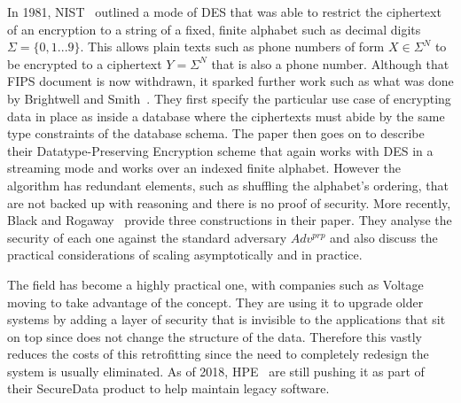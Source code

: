 \documentclass[ %
                    author={Samuel Russell},
                supervisor={Prof. Bogdan Warinschi},
                    degree={MEng},
                     title={Innocuous Ciphertexts},
                  subtitle={The DE-CENSOR Scheme},
                      type={research},
                      year={2018} ]{dissertation}
\begin{document}
In 1981, NIST~\cite{FIPS74} outlined a mode of DES that was able to restrict the ciphertext of an encryption to a string of a fixed, finite alphabet such as decimal digits $ \Sigma = \{0,1...9\} $. This allows plain texts such as phone numbers of form $ X \in \Sigma^N $ to be encrypted to a ciphertext $ Y = \Sigma^N $ that is also a phone number. Although that FIPS document is now withdrawn, it sparked further work such as what was done by Brightwell and Smith~\cite{DPE}. They first specify the particular use case of encrypting data in place as inside a database where the ciphertexts must abide by the same type constraints of the database schema. The paper then goes on to describe their  Datatype-Preserving Encryption scheme that again works with DES in a streaming mode and works over an indexed finite alphabet. However the algorithm has redundant elements, such as shuffling the alphabet's ordering, that are not backed up with reasoning and there is no proof of security. More recently, Black and Rogaway~\cite{CAFD} provide three constructions in their paper. They analyse the security of each one against the standard adversary $Adv^{prp}$ and also discuss the practical considerations of scaling asymptotically and in practice.

The field has become a highly practical one, with companies such as Voltage moving to take advantage of the concept. They are using it to upgrade older systems by adding a layer of security that is invisible to the applications that sit on top since does not change the structure of the data. Therefore this vastly reduces the costs of this retrofitting since the need to completely redesign the system is usually eliminated. As of 2018, HPE~\cite{hp} are still pushing it as part of their SecureData product to help maintain legacy software.
\end{document}
